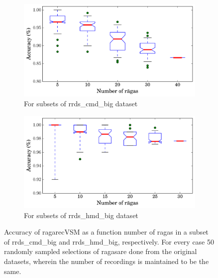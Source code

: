 \begin{figure}
	\begin{subfigure}{\textwidth}
		\centering
		\includegraphics[width=\figSizeEightyFive]{ch07_ragaRecognition/figures/Accuracy_Vs_Size_n_raagas_cmd.pdf}
		\caption{For subsets of \acrshort{rrds_cmd_big} dataset}
		\label{fig:performance_vs_n_raagas_cmd}
	\end{subfigure}
	\begin{subfigure}{\textwidth}
		\centering
		\includegraphics[width=\figSizeEightyFive]{ch07_ragaRecognition/figures/Accuracy_Vs_Size_n_raagas_hmd.pdf}
		\caption{For subsets of \acrshort{rrds_hmd_big} dataset}
		\label{fig:performance_vs_n_raagas_hmd}
	\end{subfigure}
	\caption{Accuracy of \acrshort{ragarecVSM} as a function number of \glspl{raga} in a subset of \acrshort{rrds_cmd_big}  and \acrshort{rrds_hmd_big}, respectively. For every case 50 randomly sampled selections of \glspl{raga}are done from the original datasets, wherein the number of recordings is maintained to be the same.}
	\label{fig:performance_vs_n_raagas}
\end{figure}


